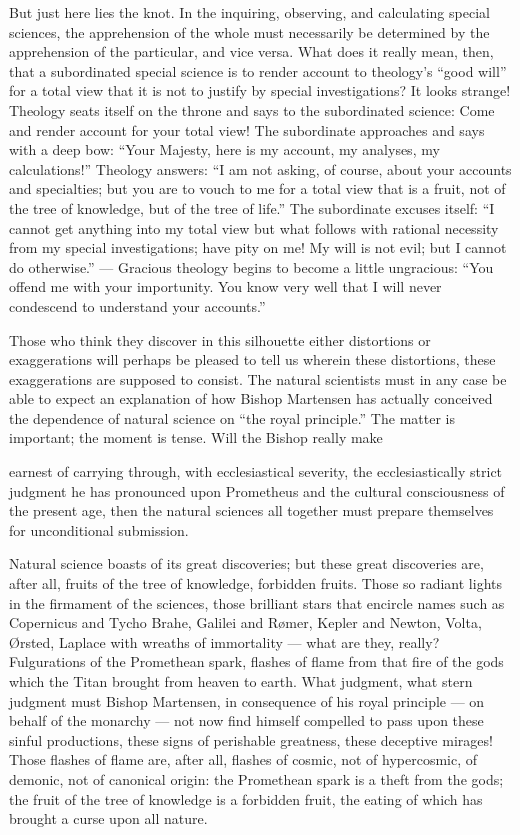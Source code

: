 \documentclass[12pt]{book}
\newcommand{\opage}[1]{\marginnote{\footnotesize\textit{[#1]}}}
\begin{document}
But just here lies the knot. In the inquiring, observing, and calculating special sciences, the apprehension of the whole must necessarily be determined by the apprehension of the particular, and vice versa. What does it really mean, then, that a subordinated special science is to render account to theology's ``good will'' for a total view that it is not to justify by special investigations? It looks strange! Theology seats itself on the throne and says to the subordinated science: Come and render account for your total view! The subordinate approaches and says with a deep bow: ``Your Majesty, here is my account, my analyses, my calculations!'' Theology answers: ``I am not asking, of course, about your accounts and specialties; but you are to vouch to me for a total view that is a fruit, not of the tree of knowledge, but of the tree of life.'' The subordinate excuses itself: ``I cannot get anything into my total view but what follows with rational necessity from my special investigations; have pity on me! My will is not evil; but I cannot do otherwise.'' --- Gracious theology begins to become a little ungracious: ``You offend me with your importunity. You know very well that I will never condescend to understand your accounts.''

Those who think they discover in this silhouette either distortions or exaggerations will perhaps be pleased to tell us wherein these distortions, these exaggerations are supposed to consist. The natural scientists must in any case be able to expect an explanation of how Bishop Martensen has actually conceived the dependence of natural science on ``the royal principle.'' The matter is important; the moment is tense. Will the Bishop really make

\opage{14}\setcounter{footnote}{0}%
earnest of carrying through, with ecclesiastical severity, the ecclesiastically strict judgment he has pronounced upon Prometheus and the cultural consciousness of the present age, then the natural sciences all together must prepare themselves for unconditional submission.

Natural science boasts of its great discoveries; but these great discoveries are, after all, fruits of the tree of knowledge, forbidden fruits. Those so radiant lights in the firmament of the sciences, those brilliant stars that encircle names such as Copernicus and Tycho Brahe, Galilei and Rømer, Kepler and Newton, Volta, Ørsted, Laplace with wreaths of immortality --- what are they, really? Fulgurations of the Promethean spark, flashes of flame from that fire of the gods which the Titan brought from heaven to earth. What judgment, what stern judgment must Bishop Martensen, in consequence of his royal principle --- on behalf of the monarchy --- not now find himself compelled to pass upon these sinful productions, these signs of perishable greatness, these deceptive mirages! Those flashes of flame are, after all, flashes of cosmic, not of hypercosmic, of demonic, not of canonical origin: the Promethean spark is a theft from the gods; the fruit of the tree of knowledge is a forbidden fruit, the eating of which has brought a curse upon all nature.
\end{document}
